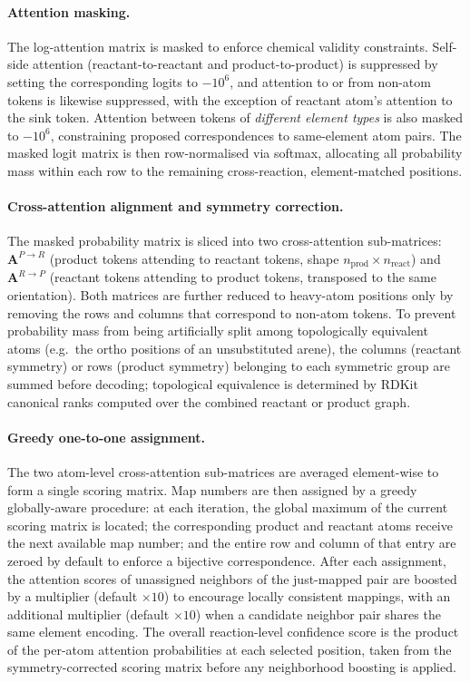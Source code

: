 \documentclass[12pt]{article}
\begin{document}
\paragraph{Attention masking.}
The log-attention matrix is masked to enforce chemical validity constraints.
Self-side attention (reactant-to-reactant and product-to-product) is
suppressed by setting the corresponding logits to $-10^6$, and attention
to or from non-atom tokens is likewise suppressed, with the exception 
of reactant atom's attention to the sink token.
Attention between tokens of \emph{different element types} is
also masked to $-10^6$, constraining proposed correspondences to
same-element atom pairs.
The masked logit matrix is then row-normalised via softmax, allocating all
probability mass within each row to the remaining cross-reaction,
element-matched positions.

\paragraph{Cross-attention alignment and symmetry correction.}
The masked probability matrix is sliced into two cross-attention sub-matrices:
$\mathbf{A}^{P \to R}$ (product tokens attending to reactant tokens, shape
$n_{\text{prod}} \times n_{\text{react}}$) and $\mathbf{A}^{R \to P}$
(reactant tokens attending to product tokens, transposed to the same
orientation).  Both matrices are further reduced to heavy-atom positions
only by removing the rows and columns that correspond to non-atom tokens.
To prevent probability mass from being artificially split among
topologically equivalent atoms (e.g.\ the ortho positions of an
unsubstituted arene), the columns (reactant symmetry) or rows (product
symmetry) belonging to each symmetric group are summed before decoding;
topological equivalence is determined by RDKit canonical ranks computed
over the combined reactant or product graph.

\paragraph{Greedy one-to-one assignment.}
The two atom-level cross-attention sub-matrices are averaged element-wise
to form a single scoring matrix.  Map numbers are then assigned by a greedy
globally-aware procedure: at each iteration, the global maximum of the
current scoring matrix is located; the corresponding product and reactant
atoms receive the next available map number; and the entire row and column
of that entry are zeroed by default to enforce a bijective correspondence.
After each assignment, the attention scores of unassigned neighbors of the
just-mapped pair are boosted by a multiplier (default $\times 10$) to
encourage locally consistent mappings, with an additional multiplier
(default $\times 10$) when a candidate neighbor pair shares the same
element encoding.
The overall reaction-level confidence score is the product of the
per-atom attention probabilities at each selected position, taken from the
symmetry-corrected scoring matrix before any neighborhood boosting is
applied.
\end{document}
